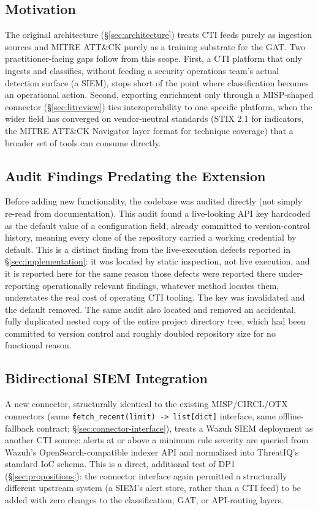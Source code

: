 \documentclass[conference]{IEEEtran}
\begin{document}
\subsection{Motivation}
The original architecture (\S\ref{sec:architecture}) treats CTI feeds purely as ingestion sources and MITRE ATT\&CK purely as a training substrate for the GAT. Two practitioner-facing gaps follow from this scope. First, a CTI platform that only ingests and classifies, without feeding a security operations team's actual detection surface (a SIEM), stops short of the point where classification becomes an operational action. Second, exporting enrichment only through a MISP-shaped connector (\S\ref{sec:litreview}) ties interoperability to one specific platform, when the wider field has converged on vendor-neutral standards (STIX 2.1 \cite{stix21} for indicators, the MITRE ATT\&CK Navigator layer format for technique coverage) that a broader set of tools can consume directly.

\subsection{Audit Findings Predating the Extension}
\label{sec:extension-audit}
Before adding new functionality, the codebase was audited directly (not simply re-read from documentation). This audit found a live-looking API key hardcoded as the default value of a configuration field, already committed to version-control history, meaning every clone of the repository carried a working credential by default. This is a distinct finding from the live-execution defects reported in \S\ref{sec:implementation}: it was located by static inspection, not live execution, and it is reported here for the same reason those defects were reported there \textemdash{} under-reporting operationally relevant findings, whatever method locates them, understates the real cost of operating CTI tooling. The key was invalidated and the default removed. The same audit also located and removed an accidental, fully duplicated nested copy of the entire project directory tree, which had been committed to version control and roughly doubled repository size for no functional reason.

\subsection{Bidirectional SIEM Integration}
A new connector, structurally identical to the existing MISP/CIRCL/OTX connectors (same \texttt{fetch\_recent(limit) -> list[dict]} interface, same offline-fallback contract; \S\ref{sec:connector-interface}), treats a Wazuh SIEM deployment as another CTI source: alerts at or above a minimum rule severity are queried from Wazuh's OpenSearch-compatible indexer API and normalized into ThreatIQ's standard IoC schema. This is a direct, additional test of DP1 (\S\ref{sec:propositions}): the connector interface again permitted a structurally different upstream system (a SIEM's alert store, rather than a CTI feed) to be added with zero changes to the classification, GAT, or API-routing layers.
\end{document}
